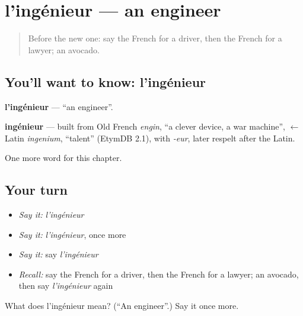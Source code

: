 \section[l'ingénieur]{l'ingénieur — an engineer}

\label{lesson:FR-C124-ingenieur}



\begin{quote}
Before the new one: say the French for a driver, then the French for a lawyer; an avocado.
\end{quote}

\subsection*{You'll want to know: l'ingénieur}
\textbf{l'ingénieur} — \textquotedblleft{}an engineer\textquotedblright{}.

\begin{cousinweb}
\textbf{ingénieur} — built from Old French \emph{engin}, \textquotedblleft{}a clever device, a war machine\textquotedblright{}, $\leftarrow$ Latin \emph{ingenium}, \textquotedblleft{}talent\textquotedblright{} (EtymDB 2.1), with \emph{-eur}, later respelt after the Latin.
\end{cousinweb}

\begin{grammarlens}[title={What you've built}]
One more word for this chapter.
\end{grammarlens}

\subsection*{Your turn}
\begin{itemize}
\raggedright
  \item \emph{Say it:} \emph{l'ingénieur}
  \item \emph{Say it:} \emph{l'ingénieur}, once more
  \item \emph{Say it:} say \emph{l'ingénieur}
  \item \emph{Recall:} say the French for a driver, then the French for a lawyer; an avocado, then say \emph{l'ingénieur} again
\end{itemize}

\begin{tcolorbox}[breakable,colback=teal!4,colframe=teal!35!black,title={Before you move on}]
What does l'ingénieur mean? (\textquotedblleft{}An engineer\textquotedblright{}.) Say it once more.
\end{tcolorbox}
